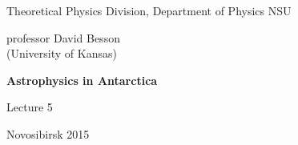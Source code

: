 \documentclass[12pt,pagesize,paper=192mm:108mm]{scrbook}
\begin{document}
\begin{titlepage}
\begin{center}
    Theoretical Physics Division, Department of Physics NSU
    \medskip

    \Large
    professor David Besson\\ (University of Kansas)
    \bigskip

    \huge
    \textbf{Astrophysics in Antarctica}
    \bigskip

    \Large
    Lecture 5
    \vfill

    \normalsize
    \vfill

    \normalsize \ccbysa\hspace{0.5em}  Novosibirsk 2015
  \end{center}
\end{titlepage}
\end{document}
